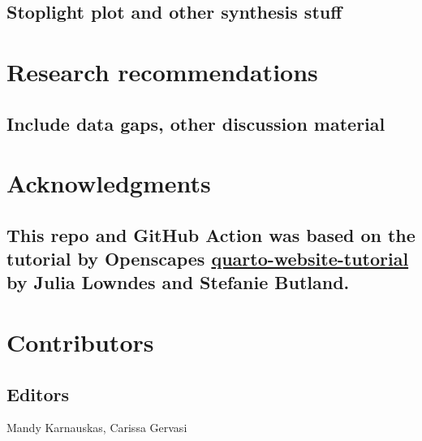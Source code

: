 \documentclass[
  letterpaper,
  oneside,
  open=any]{scrbook}
\begin{document}
\section{Stoplight plot and other synthesis
stuff}\label{stoplight-plot-and-other-synthesis-stuff}


\chapter{Research recommendations}\label{research-recommendations}

\section{Include data gaps, other discussion
material}\label{include-data-gaps-other-discussion-material}


\chapter{Acknowledgments}\label{acknowledgments}

\section{\texorpdfstring{This repo and GitHub Action was based on the
tutorial by Openscapes
\href{https://github.com/Openscapes/quarto-website-tutorial}{quarto-website-tutorial}
by Julia Lowndes and Stefanie
Butland.}{This repo and GitHub Action was based on the tutorial by Openscapes quarto-website-tutorial by Julia Lowndes and Stefanie Butland.}}\label{this-repo-and-github-action-was-based-on-the-tutorial-by-openscapes-quarto-website-tutorial-by-julia-lowndes-and-stefanie-butland.}


\chapter{Contributors}\label{contributors}

\section{\texorpdfstring{\textbf{Editors}}{Editors}}\label{editors}

Mandy Karnauskas, Carissa Gervasi
\end{document}
